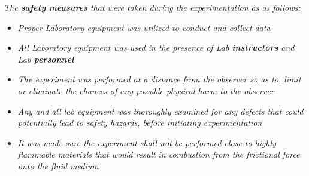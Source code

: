 

\textit{The \textbf{safety measures} that were taken during the experimentation as as follows:}

	\begin{itemize}
		\item \textit{Proper Laboratory equipment was utilized to conduct and collect data}
		\item \textit{All Laboratory equipment was used in the presence of Lab \textbf{instructors} and Lab \textbf{personnel}}
		\item \textit{The experiment was performed at a distance from the observer so as to, limit or eliminate the chances of any possible physical harm to the observer}
		\item \textit{Any and all lab equipment was thoroughly examined for any defects that could potentially lead to safety hazards, before initiating experimentation}
		\item \textit{It was made sure the experiment shall not be performed close to highly flammable materials that would result in combustion from the frictional force onto the fluid medium}
	\end{itemize}

